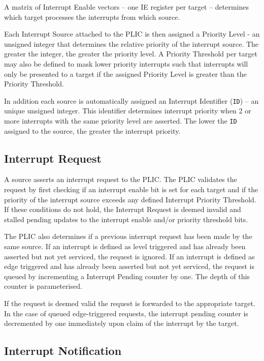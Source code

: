 A matrix of Interrupt Enable vectors -- one IE register per target --
determines which target processes the interrupts from which source.

Each Interrupt Source attached to the PLIC is then assigned a Priority
Level - an unsigned integer that determines the relative priority of
the interrupt source. The greater the integer, the greater the priority
level. A Priority Threshold per target may also be defined to mask lower
priority interrupts such that interrupts will only be presented to a
target if the assigned Priority Level is greater than the Priority Threshold.

In addition each source is automatically assigned an Interrupt Identifier
(\texttt{ID}) -- an unique unsigned integer. This identifier determines
interrupt priority when 2 or more interrupts with the same priority
level are asserted. The lower the \texttt{ID} assigned to the source,
the greater the interrupt priority.

\subsection{Interrupt Request}

A source asserts an interrupt request to the PLIC. The PLIC validates
the request by first checking if an interrupt enable bit is set for each
target and if the priority of the interrupt source exceeds any defined
Interrupt Priority Threshold. If these conditions do not hold, the
Interrupt Request is deemed invalid and stalled pending updates to the interrupt enable and/or priority threshold bits. 

The PLIC also determines if a previous interrupt request has been made
by the same source. If an interrupt is defined as level triggered and
has already been asserted but not yet serviced, the request is ignored.
If an interrupt is defined as edge triggered and has already been
asserted but not yet serviced, the request is queued by incrementing a
Interrupt Pending counter by one. The depth of this counter is
parameterised.

If the request is deemed valid the request is forwarded to the
appropriate target. In the case of queued edge-triggered requests, the
interrupt pending counter is decremented by one immediately upon claim of the interrupt by the target.

\subsection{Interrupt Notification}

